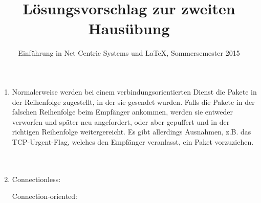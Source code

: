 \documentclass[a4paper,
			llpt,
			solution,
			accentcolor=tud2d,
			colorbacktitle
			]
			{tudexercise}
\title{Lösungsvorschlag zur zweiten Hausübung}
\subtitle{Einführung in Net Centric Systems und \LaTeX, Sommersemester 2015}
\begin{document}
\maketitle

\setcounter{section}{2}
\subsection{}


\begin{multicols}{2}
\begin{enumerate}

\item
Normalerweise werden bei einem verbindungsorientierten Dienst die Pakete in der Reihenfolge zugestellt, in der sie gesendet wurden. Falls die Pakete in der falschen Reihenfolge beim Empfänger ankommen, werden sie entweder verworfen und später neu angefordert, oder aber gepuffert und in der richtigen Reihenfolge weitergereicht.
Es gibt allerdings Ausnahmen, z.B. das TCP-Urgent-Flag, welches den Empfänger veranlasst, ein Paket vorzuziehen.
\\\\\\

\item
Connectionless:
Connection-oriented:
\end{enumerate}
\end{multicols}
\subsection{}

\end{document}
